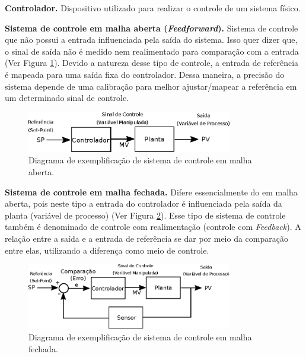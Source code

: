 \textbf{Controlador.} Dispositivo utilizado para realizar o controle de um sistema físico.



\textbf{Sistema de controle em malha aberta (\emph{Feedforward}).} Sistema de controle que não possui a entrada influenciada pela saída do sistema. Isso quer dizer que, o sinal de saída não é medido nem realimentado para comparação com a entrada (Ver Figura \ref{fig:ilustracao_sistema_malha_aberta}). Devido a natureza desse tipo de controle, a entrada de referência é mapeada para uma saída fixa do controlador. Dessa maneira, a precisão do sistema depende de uma calibração para melhor ajustar/mapear a referência em um determinado sinal de controle.

\begin{figure}[H]
    \centering
    \includegraphics[width=0.8\textwidth]{imagens/ilustracoes/diagrama_sistema_malha_aberta.eps}
    \caption{Diagrama de exemplificação de sistema de controle em malha aberta.}
    \label{fig:ilustracao_sistema_malha_aberta}
\end{figure}

\textbf{Sistema de controle em malha fechada.} Difere essencialmente do em malha aberta, pois neste tipo a entrada do controlador é influenciada pela saída da planta (variável de processo) (Ver Figura \ref{fig:ilustracao_sistema_malha_fechada}). Esse tipo de sistema de controle também é denominado de controle com realimentação (controle com \emph{Feedback}). A relação entre a saída e a entrada de referência se dar por meio da comparação entre elas, utilizando a diferença como meio de controle.

\begin{figure}[H]
    \centering
    \includegraphics[width=0.8\textwidth]{imagens/ilustracoes/diagrama_sistema_malha_fechada.eps}
    \caption{Diagrama de exemplificação de sistema de controle em malha fechada.}
    \label{fig:ilustracao_sistema_malha_fechada}
\end{figure}


